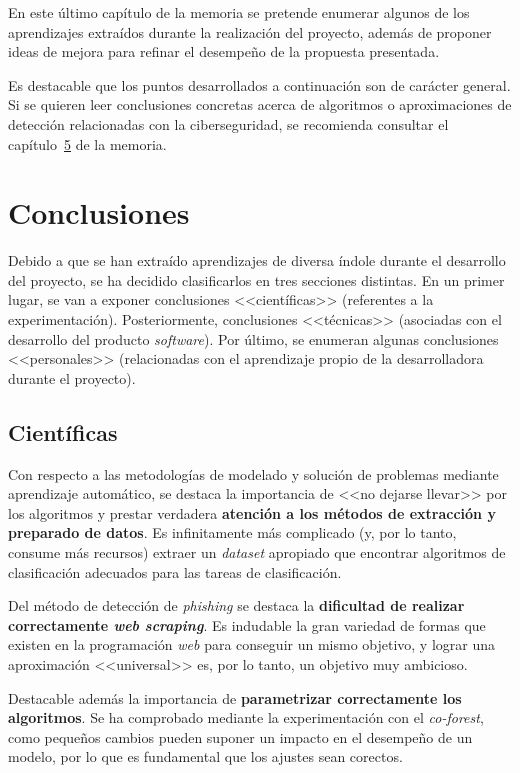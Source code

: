
En este último capítulo de la memoria se pretende enumerar algunos de los aprendizajes extraídos durante la realización del proyecto, además de proponer ideas de mejora para refinar el desempeño de la propuesta presentada.

Es destacable que los puntos desarrollados a continuación son de carácter general. Si se quieren leer conclusiones concretas acerca de algoritmos o aproximaciones de detección relacionadas con la ciberseguridad, se recomienda consultar el capítulo~\hyperref[s:5]{5} de la memoria.

\section{Conclusiones}

Debido a que se han extraído aprendizajes de diversa índole durante el desarrollo del proyecto, se ha decidido clasificarlos en tres secciones distintas. En un primer lugar, se van a exponer conclusiones <<científicas>> (referentes a la experimentación). Posteriormente, conclusiones <<técnicas>> (asociadas con el desarrollo del producto \textit{software}). Por último, se enumeran algunas conclusiones <<personales>> (relacionadas con el aprendizaje propio de la desarrolladora durante el proyecto).

\subsection{Científicas}

Con respecto a las metodologías de modelado y solución de problemas mediante aprendizaje automático, se destaca la importancia de <<no dejarse llevar>> por los algoritmos y prestar verdadera \textbf{atención a los métodos de extracción y preparado de datos}. Es infinitamente más complicado (y, por lo tanto, consume más recursos) extraer un \textit{dataset} apropiado que encontrar algoritmos de clasificación adecuados para las tareas de clasificación.

Del método de detección de \textit{phishing} se destaca la \textbf{dificultad de realizar correctamente \textit{web scraping}}. Es indudable la gran variedad de formas que existen en la programación \textit{web} para conseguir un mismo objetivo, y lograr una aproximación <<universal>> es, por lo tanto, un objetivo muy ambicioso.

Destacable además la importancia de \textbf{parametrizar correctamente los algoritmos}. Se ha comprobado mediante la experimentación con el \textit{co-forest}, como pequeños cambios pueden suponer un impacto en el desempeño de un modelo, por lo que es fundamental que los ajustes sean corectos.


